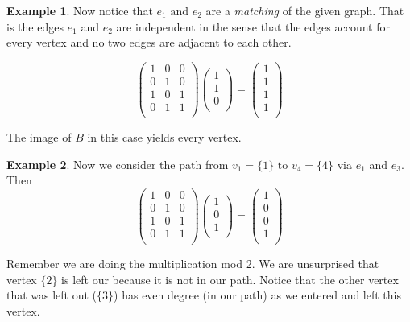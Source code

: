 \documentclass[10pt, letterpaper]{article}
\theoremstyle{remark}
\theoremstyle{definition}
\newtheorem{ex}{Example}
\begin{document}
\begin{ex}
Now notice that $e_1 \text{ and } e_2$ are a \textit{matching} of the given graph. That is the edges $e_1$ and $e_2$ are independent in the sense that the edges account for every vertex and no two edges are adjacent to each other.

\[
	\begin{pmatrix}
		1 & 0 & 0 \\
		0 & 1 & 0 \\
		1 & 0 & 1 \\
		0 & 1 & 1 \\
	\end{pmatrix}
	\begin{pmatrix}
		1 \\ 1 \\ 0 \\
	\end{pmatrix} =
	\begin{pmatrix}
		1 \\ 1 \\ 1 \\ 1 \\
	\end{pmatrix}
\]

The image of $B$ in this case yields every vertex.
\end{ex}

\begin{ex}
	Now we consider the path from $v_1=\{1\} \text{ to } v_4=\{4\}$ via $e_1$ and $e_3$. Then
	\[
		\begin{pmatrix}
		1 & 0 & 0 \\
		0 & 1 & 0 \\
		1 & 0 & 1 \\
		0 & 1 & 1 \\
	\end{pmatrix}
	\begin{pmatrix}
		1 \\ 0 \\ 1 \\
	\end{pmatrix} =
	\begin{pmatrix}
		1 \\ 0 \\ 0 \\ 1 \\
	\end{pmatrix}
	\]
	
Remember we are doing the multiplication mod 2. We are unsurprised that vertex $\{2\}$ is left our because it is not in our path. Notice that the other vertex that was left out ($\{3\}$) has even degree (in our path) as we entered and left this vertex.
\end{ex}
\end{document}
